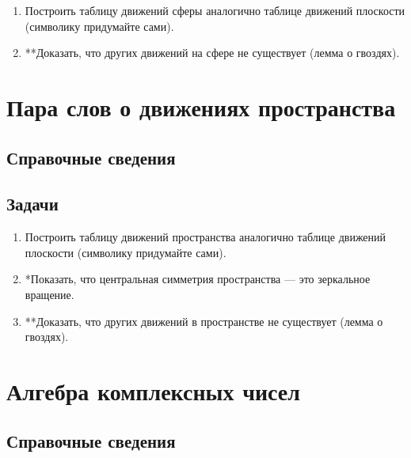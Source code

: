 \begin{enumerate}
\item Построить таблицу движений сферы аналогично таблице движений плоскости (символику придумайте сами).
\item **Доказать, что других движений на сфере не существует (лемма о гвоздях).
\end{enumerate}


\section{Пара слов о движениях пространства}

\subsection*{Справочные сведения}

\subsection*{Задачи}

\begin{enumerate}
\item Построить таблицу движений пространства аналогично таблице движений плоскости (символику придумайте сами).
\item *Показать, что центральная симметрия пространства --- это зеркальное вращение.
\item **Доказать, что других движений в пространстве не существует (лемма о гвоздях).
\end{enumerate}

\section{Алгебра комплексных чисел}

\subsection*{Справочные сведения}

